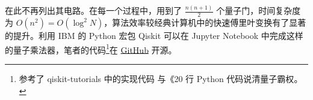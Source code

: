 在此不再列出其电路。在每一个过程中，用到了 $\frac{n(n+1)}{2}$ 个量子门，时间复杂度为 $O(n^2)=O(\log^2 N)$，算法效率较经典计算机中的快速傅里叶变换有了显著的提升。利用 IBM 的 Python 宏包 Qiskit 可以在 Jupyter Notebook 中完成这样的量子乘法器，笔者的代码\footnote{参考了 qiskit-tutorials 中的实现代码\cite{Qiskit} 与《20 行 Python 代码说清量子霸权\cite{马超20行Python代码说清量子霸权}。}在 \href{https://github.com/Conless/quantum-computing-intro/blob/main/src/qft.ipynb}{GitHub} 开源。
